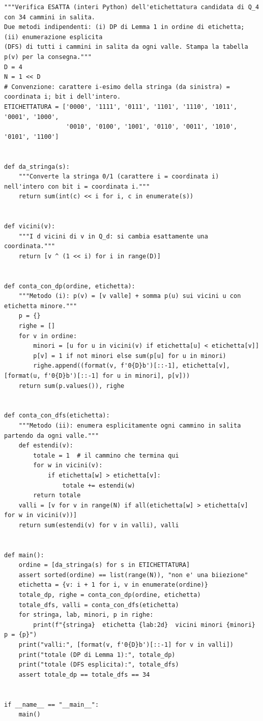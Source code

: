 \documentclass[11pt,a4paper]{article}
\begin{document}
\begin{lstlisting}[caption={attempt\_001 code\_1 [python, rigore exact] — Exact verification of the submitted labelling of Q\_4: bijection check, valleys, per-vertex — verdetto del Referee: (nessun verdetto)}]
"""Verifica ESATTA (interi Python) dell'etichettatura candidata di Q_4 con 34 cammini in salita.
Due metodi indipendenti: (i) DP di Lemma 1 in ordine di etichetta; (ii) enumerazione esplicita
(DFS) di tutti i cammini in salita da ogni valle. Stampa la tabella p(v) per la consegna."""
D = 4
N = 1 << D
# Convenzione: carattere i-esimo della stringa (da sinistra) = coordinata i; bit i dell'intero.
ETICHETTATURA = ['0000', '1111', '0111', '1101', '1110', '1011', '0001', '1000',
                 '0010', '0100', '1001', '0110', '0011', '1010', '0101', '1100']


def da_stringa(s):
    """Converte la stringa 0/1 (carattere i = coordinata i) nell'intero con bit i = coordinata i."""
    return sum(int(c) << i for i, c in enumerate(s))


def vicini(v):
    """I d vicini di v in Q_d: si cambia esattamente una coordinata."""
    return [v ^ (1 << i) for i in range(D)]


def conta_con_dp(ordine, etichetta):
    """Metodo (i): p(v) = [v valle] + somma p(u) sui vicini u con etichetta minore."""
    p = {}
    righe = []
    for v in ordine:
        minori = [u for u in vicini(v) if etichetta[u] < etichetta[v]]
        p[v] = 1 if not minori else sum(p[u] for u in minori)
        righe.append((format(v, f'0{D}b')[::-1], etichetta[v], [format(u, f'0{D}b')[::-1] for u in minori], p[v]))
    return sum(p.values()), righe


def conta_con_dfs(etichetta):
    """Metodo (ii): enumera esplicitamente ogni cammino in salita partendo da ogni valle."""
    def estendi(v):
        totale = 1  # il cammino che termina qui
        for w in vicini(v):
            if etichetta[w] > etichetta[v]:
                totale += estendi(w)
        return totale
    valli = [v for v in range(N) if all(etichetta[w] > etichetta[v] for w in vicini(v))]
    return sum(estendi(v) for v in valli), valli


def main():
    ordine = [da_stringa(s) for s in ETICHETTATURA]
    assert sorted(ordine) == list(range(N)), "non e' una biiezione"
    etichetta = {v: i + 1 for i, v in enumerate(ordine)}
    totale_dp, righe = conta_con_dp(ordine, etichetta)
    totale_dfs, valli = conta_con_dfs(etichetta)
    for stringa, lab, minori, p in righe:
        print(f"{stringa}  etichetta {lab:2d}  vicini minori {minori}  p = {p}")
    print("valli:", [format(v, f'0{D}b')[::-1] for v in valli])
    print("totale (DP di Lemma 1):", totale_dp)
    print("totale (DFS esplicita):", totale_dfs)
    assert totale_dp == totale_dfs == 34


if __name__ == "__main__":
    main()

\end{lstlisting}
\end{document}
